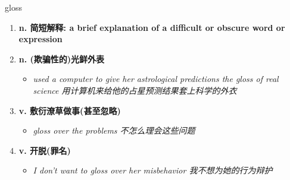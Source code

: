 
\begin{frame}
{\huge gloss}
\begin{center}
\begin{enumerate}\Large
  \item \textbf{n. 简短解释: a brief explanation of a difficult or obscure word or expression}
  \item \textbf{n. (欺骗性的)光鲜外表}
  \begin{itemize}
    \item \em{\Large{used a computer to give her astrological predictions the gloss of real science 用计算机来给他的占星预测结果套上科学的外衣}}
  \end{itemize}
  \item \textbf{v. 敷衍潦草做事(甚至忽略)}
  \begin{itemize}
    \item \em{\Large{gloss over the problems 不怎么理会这些问题}}
  \end{itemize}
  \item \textbf{v. 开脱(罪名)}
  \begin{itemize}
    \item \em{\Large{I don't want to gloss over her misbehavior 我不想为她的行为辩护}}
  \end{itemize}
\end{enumerate}
\end{center}
\end{frame}
